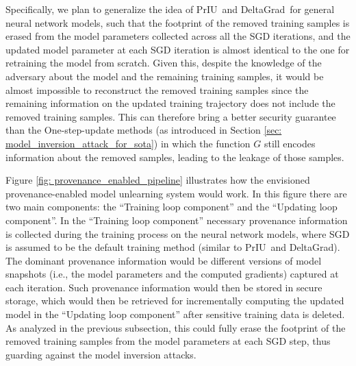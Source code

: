 \documentclass[11pt]{article}
\newcommand{\priu}{PrIU}
\newcommand{\deltagrad}{DeltaGrad}
\begin{document}
Specifically, we plan to generalize the idea of \priu\ and \deltagrad\ for general neural network models, such that the footprint of the removed training samples is erased from the model parameters collected across all the SGD iterations, and the updated model parameter at each SGD iteration is almost identical to the one for retraining the model from scratch. 
Given this, despite the knowledge of the adversary about the model and the remaining training samples, it would be almost impossible to reconstruct the removed training samples since the remaining information on the updated training trajectory does not include the removed training samples. This can therefore bring a better security guarantee than the One-step-update methods (as introduced in Section \ref{sec: model_inversion_attack_for_sota}) in which the function $G$ still encodes information about the removed samples, leading to the leakage of those samples. 

Figure \ref{fig: provenance_enabled_pipeline} illustrates how the envisioned provenance-enabled model unlearning system would work.  In this figure there are two main components: the ``Training loop component'' and the ``Updating loop component''. In the ``Training loop component'' necessary provenance information is collected during the training process on the neural network models, where SGD is assumed to be the default training method (similar to \priu\ and \deltagrad). The dominant provenance information would be different versions of model snapshots (i.e., the model parameters and the computed gradients) captured at each iteration. Such provenance information would then be stored in secure storage, which would then be retrieved for incrementally computing the updated model in the ``Updating loop component'' after sensitive training data is deleted. As analyzed in the previous subsection, this could fully erase the footprint of the removed training samples from the model parameters at each SGD step, thus guarding against the model inversion attacks.

\end{document}
